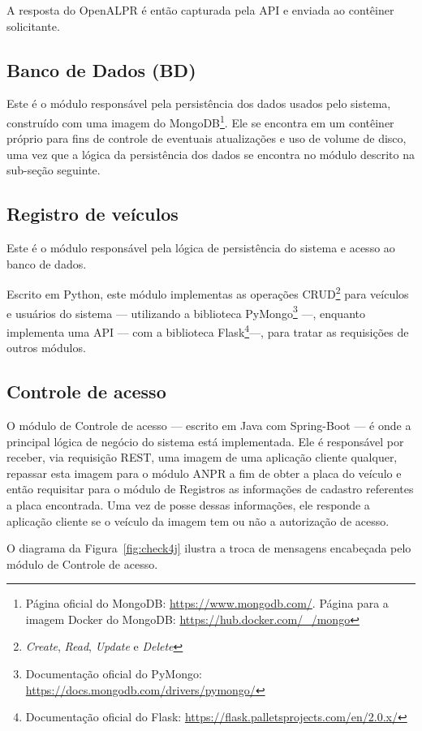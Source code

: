 \documentclass[12pt]{article}
\begin{document}
A resposta do OpenALPR é então capturada pela API e enviada ao contêiner solicitante.

\subsection{Banco de Dados (BD)}

Este é o módulo responsável pela persistência dos dados usados pelo sistema, construído com uma imagem do MongoDB\footnote{Página oficial do MongoDB: \url{https://www.mongodb.com/}. Página para a imagem Docker do MongoDB: \url{https://hub.docker.com/_/mongo}}. Ele se encontra em um contêiner próprio para fins de controle de eventuais atualizações e uso de volume de disco, uma vez que a lógica da persistência dos dados se encontra no módulo descrito na sub-seção seguinte.

\subsection{Registro de veículos}

Este é o módulo responsável pela lógica de persistência do sistema e acesso ao banco de dados.

Escrito em Python, este módulo implementas as operações CRUD\footnote{\textit{Create}, \textit{Read}, \textit{Update} e \textit{Delete}} para veículos e usuários do sistema — utilizando a biblioteca PyMongo\footnote{Documentação oficial do PyMongo: \url{https://docs.mongodb.com/drivers/pymongo/}} —, enquanto implementa uma API — com a biblioteca Flask\footnote{Documentação oficial do Flask: \url{https://flask.palletsprojects.com/en/2.0.x/}}—, para tratar as requisições de outros módulos.

\subsection{Controle de acesso}

O módulo de Controle de acesso — escrito em Java com Spring-Boot — é onde a principal lógica de negócio do sistema está implementada. Ele é responsável por receber, via requisição REST, uma imagem de uma aplicação cliente qualquer, repassar esta imagem para o módulo ANPR a fim de obter a placa do veículo e então requisitar para o módulo de Registros as informações de cadastro referentes a placa encontrada. Uma vez de posse dessas informações, ele responde a aplicação cliente se o veículo da imagem tem ou não a autorização de acesso.

O diagrama da Figura~\ref{fig:check4j} ilustra a troca de mensagens encabeçada pelo módulo de Controle de acesso.
\end{document}
